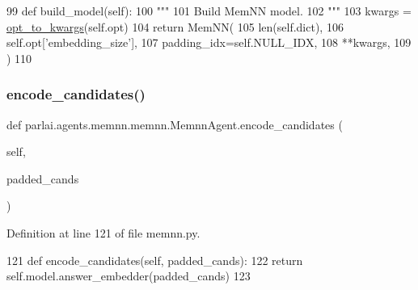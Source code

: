 \begin{DoxyCode}
99     \textcolor{keyword}{def }build\_model(self):
100         \textcolor{stringliteral}{"""}
101 \textcolor{stringliteral}{        Build MemNN model.}
102 \textcolor{stringliteral}{        """}
103         kwargs = \hyperlink{namespaceparlai_1_1agents_1_1legacy__agents_1_1seq2seq_1_1modules__v1_af13e3733abb5828b0c0a75d95833441c}{opt\_to\_kwargs}(self.opt)
104         \textcolor{keywordflow}{return} MemNN(
105             len(self.dict),
106             self.opt[\textcolor{stringliteral}{'embedding\_size'}],
107             padding\_idx=self.NULL\_IDX,
108             **kwargs,
109         )
110 
\end{DoxyCode}
\mbox{\label{classparlai_1_1agents_1_1memnn_1_1memnn_1_1MemnnAgent_ab0c47ca129aeec437446202c941e0a56}} 
\subsubsection{\texorpdfstring{encode\+\_\+candidates()}{encode\_candidates()}}
{\footnotesize\ttfamily def parlai.\+agents.\+memnn.\+memnn.\+Memnn\+Agent.\+encode\+\_\+candidates (\begin{DoxyParamCaption}\item[{}]{self,  }\item[{}]{padded\+\_\+cands }\end{DoxyParamCaption})}



Definition at line 121 of file memnn.\+py.


\begin{DoxyCode}
121     \textcolor{keyword}{def }encode\_candidates(self, padded\_cands):
122         \textcolor{keywordflow}{return} self.model.answer\_embedder(padded\_cands)
123 
\end{DoxyCode}
\mbox{\label{classparlai_1_1agents_1_1memnn_1_1memnn_1_1MemnnAgent_ae6e06364ccf919d70064d5966e5c1cf3}} 
